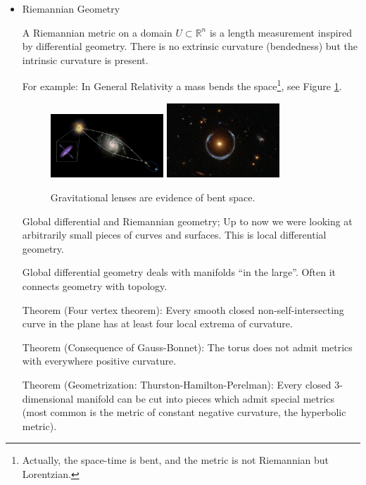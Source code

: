 \documentclass[a4paper,11pt,notitlepage,fullpage]{paper}
\theoremstyle{plain}
\theoremstyle{definition}
\begin{document}
\begin{itemize}
\item Riemannian Geometry

A Riemannian metric on a domain $U \subset \mathbb R^n$ is a length measurement inspired by differential geometry. There is no extrinsic curvature (bendedness) but the intrinsic curvature is present.

For example: In General Relativity a mass bends the space\footnote{Actually, the space-time is bent, and the metric is not Riemannian but Lorentzian.}, see Figure \ref{fig:gravlens}.

\begin{figure}
\centering
\includegraphics[width = 0.4\textwidth]{img/gravlens1}
\includegraphics[width = 0.4\textwidth]{img/gravlens2}
\caption{Gravitational lenses are evidence of bent space.}
\label{fig:gravlens}
\end{figure}


Global differential and Riemannian geometry;
Up to now we were looking at arbitrarily small pieces of curves and surfaces. This is local differential geometry.

Global differential geometry deals with manifolds ``in the large''.
Often it connects geometry with topology.


Theorem (Four vertex theorem): Every smooth closed non-self-intersecting curve in the plane has at least four local extrema of curvature.

Theorem (Consequence of Gauss-Bonnet): The torus does not admit metrics with everywhere positive curvature.

Theorem (Geometrization: Thurston-Hamilton-Perelman): Every closed 3-dimensional manifold can be cut into pieces which admit special metrics (most common is the metric of constant negative curvature, the hyperbolic metric).

\end{itemize}
\end{document}
